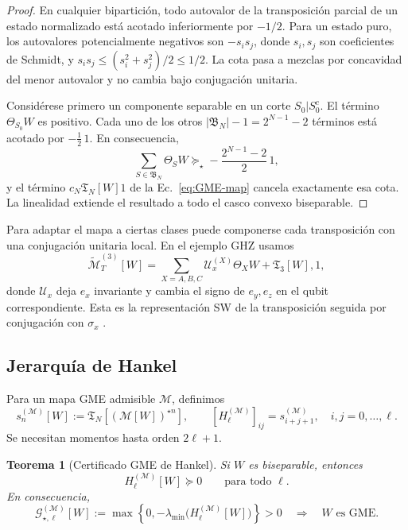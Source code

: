 \documentclass[11pt,a4paper]{article}
\newcommand{\Tfun}{\mathfrak T}
\newcommand{\starprod}{\star}
\newtheorem{theorem}{Teorema}
\theoremstyle{definition}
\begin{document}
\begin{proof}
En cualquier bipartición, todo autovalor de la transposición parcial de un
estado normalizado está acotado inferiormente por $-1/2$. Para un estado puro,
los autovalores potencialmente negativos son $-s_i s_j$, donde $s_i,s_j$ son
coeficientes de Schmidt, y
$s_i s_j\leq(s_i^2+s_j^2)/2\leq1/2$. La cota pasa a mezclas por concavidad del
menor autovalor y no cambia bajo conjugación unitaria.

Considérese primero un componente separable en un corte $S_0|S_0^c$. El término
$\Theta_{S_0}W$ es positivo. Cada uno de los otros
$|\mathfrak B_N|-1=2^{N-1}-2$ términos está acotado por
$-\tfrac12\,1$. En consecuencia,
\begin{equation}
 \sum_{S\in\mathfrak B_N}\Theta_SW
 \succeq_\star-\frac{2^{N-1}-2}{2}\,1,
\end{equation}
y el término $c_N\Tfun_N[W]1$ de la Ec.~\eqref{eq:GME-map} cancela exactamente
esa cota. La linealidad extiende el resultado a todo el casco convexo
biseparable.
\end{proof}

Para adaptar el mapa a ciertas clases puede componerse cada transposición con
una conjugación unitaria local. En el ejemplo GHZ usamos
\begin{equation}
 \widetilde{\mathcal M}_T^{(3)}[W]
 =\sum_{X=A,B,C}\mathcal U_x^{(X)}\Theta_XW+\Tfun_3[W],1,
 \label{eq:modified-map}
\end{equation}
donde $\mathcal U_x$ deja $e_x$ invariante y cambia el signo de $e_y,e_z$ en el
qubit correspondiente. Esta es la representación SW de la transposición seguida
por conjugación con $\sigma_x$ \cite{Clivaz2017GMEMaps,
Mukherjee2025GMEMoments}.

\subsection{Jerarquía de Hankel}

Para un mapa GME admisible $\mathcal M$, definimos
\begin{equation}
 s_n^{(\mathcal M)}[W]
 :=\Tfun_N\!\left[(\mathcal M[W])^{\starprod n}\right],
 \qquad
 [H_\ell^{(\mathcal M)}]_{ij}=s_{i+j+1}^{(\mathcal M)},
 \quad i,j=0,\ldots,\ell.
 \label{eq:GME-moments}
\end{equation}
Se necesitan momentos hasta orden $2\ell+1$.

\begin{theorem}[Certificado GME de Hankel]
Si $W$ es biseparable, entonces
\begin{equation}
 H_\ell^{(\mathcal M)}[W]\succeq0
 \qquad\text{para todo }\ell.
 \label{eq:Hankel-positive}
\end{equation}
En consecuencia,
\begin{equation}
 \mathcal G_{\star,\ell}^{(\mathcal M)}[W]
 :=\max\left\{0,-\lambda_{\min}
 \bigl(H_\ell^{(\mathcal M)}[W]\bigr)\right\}>0
 \quad\Longrightarrow\quad W\text{ es GME}.
 \label{eq:Gstar}
\end{equation}
\end{theorem}
\end{document}
